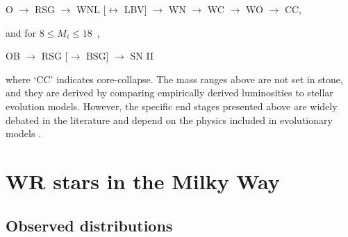 \centerline{O $\longrightarrow$ RSG $\longrightarrow$ WNL [$\longleftrightarrow$ LBV] $\longrightarrow$ WN $\longrightarrow$ WC $\longrightarrow$ WO $\longrightarrow$ CC,}

and for $8 \le M_i \le 18\,$ \Msun{},

\centerline{OB $\longrightarrow$ RSG [$\longrightarrow$ BSG] $\longrightarrow$ SN II}

where `CC' indicates core-collapse. The mass ranges above are not set in stone, and they are derived by comparing empirically derived luminosities to stellar evolution models. However, the specific end stages presented above are widely debated in the literature and depend on the physics included in evolutionary models \citep[e.g., see][]{heger_how_2003,woosley_supernova_2006,2017LamersLevesque}.

\section{WR stars in the Milky Way}


\subsection{Observed distributions}

